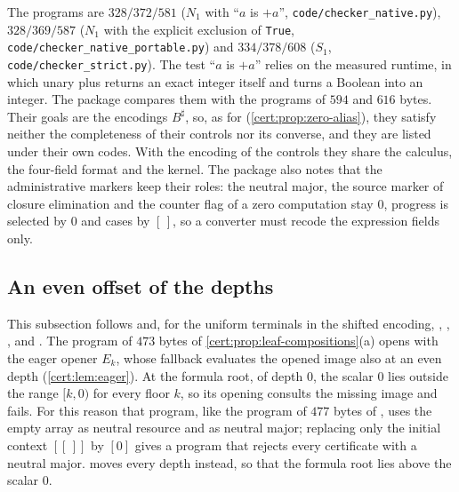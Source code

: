 The programs are $328/372/581$ ($N_1$ with ``$a$ is $+a$'',
\texttt{code/checker\_native.py}), $328/369/587$ ($N_1$ with the explicit
exclusion of \texttt{True}, \texttt{code/checker\_native\_portable.py}) and
$334/378/608$ ($S_1$, \texttt{code/checker\_strict.py}). The test ``$a$ is
$+a$'' relies on the measured runtime, in which unary plus returns an exact
integer itself and turns a Boolean into an integer. The package compares them
with the programs of $594$ and $616$ bytes. Their goals are the encodings
$B^{\sharp}$, so, as for 
(\cref{cert:prop:zero-alias}), they satisfy neither the completeness of their
controls nor its converse, and they are listed under their own codes. With the
encoding of the controls they share the calculus, the four-field format and
the kernel. The package also notes that the administrative markers keep their
roles: the neutral major, the source marker of closure elimination and the
counter flag of a zero computation stay $0$, progress is selected by $0$ and
cases by $[\,]$, so a converter must recode the expression fields only.

\subsection{An even offset of the depths}\label{cert:sec:offset}

This subsection follows  and, for the uniform terminals in the
shifted encoding, , ,
,  and
. The program of $473$ bytes of
\cref{cert:prop:leaf-compositions}(a) opens with the eager opener $E_k$, whose
fallback evaluates the opened image also at an even depth
(\cref{cert:lem:eager}). At the formula root, of depth $0$, the scalar $0$ lies
outside the range $[k,0)$ for every floor $k$, so its opening consults the
missing image and fails. For this reason that program, like the program of
$477$ bytes of , uses the empty array as neutral resource
and as neutral major; replacing only the initial context $[[\,]]$ by $[0]$ gives
a program that rejects every certificate with a neutral major. 
moves every depth instead, so that the formula root lies above the scalar $0$.

